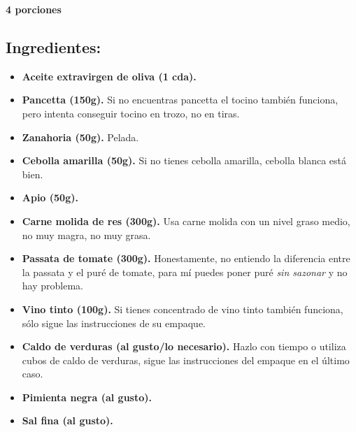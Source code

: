 \documentclass{book}
\begin{document}
\textbf{4 porciones}

\subsection*{Ingredientes:}
\begin{itemize}
	\item \textbf{Aceite extravirgen de oliva (1 cda).}
	\item \textbf{Pancetta (150g).} Si no encuentras pancetta el tocino también funciona, pero intenta conseguir tocino en trozo, no en tiras.
	\item \textbf{Zanahoria (50g).} Pelada.
	\item \textbf{Cebolla amarilla (50g).} Si no tienes cebolla amarilla, cebolla blanca está bien.
	\item \textbf{Apio (50g).}
	\item \textbf{Carne molida de res (300g).} Usa  carne molida con un nivel graso medio, no muy magra, no muy grasa.
	\item \textbf{Passata de tomate (300g).} Honestamente, no entiendo la diferencia entre la passata y el puré de tomate, para mí puedes poner puré \textit{sin sazonar} y no hay problema.
	\item \textbf{Vino tinto (100g).} Si tienes concentrado de vino tinto también funciona, sólo sigue las instrucciones de su empaque.
	\item \textbf{Caldo de verduras (al gusto/lo necesario).} Hazlo con tiempo o utiliza cubos de caldo de verduras, sigue las instrucciones del empaque en el último caso.
	\item \textbf{Pimienta negra (al gusto).}
	\item \textbf{Sal fina (al gusto).}
\end{itemize}
\end{document}
